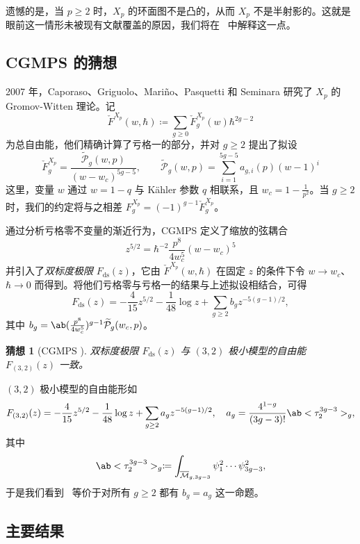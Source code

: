 \documentclass{amsart}
\newtheorem{conj}[thm]{猜想}
\theoremstyle{definition}
\theoremstyle{remark}
\theoremstyle{plain}
\theoremstyle{definition}
\theoremstyle{remark}
\newcommand{\Mbar}{\overline{\mathcal{M}}}
\newcommand{\mc}[1]{\mathcal{#1}}
\newcommand{\mr}[1]{\mathrm{#1}}
\newcommand{\wt}[1]{\widetilde{#1}}
\newcommand{\1}{\mathbf{1}}
\newcommand{\2}{\mathbf{2}}
\newcommand{\3}{\mathbf{3}}
\begin{document}
遗憾的是，当 \(p \geq 2\) 时，\(X_p\) 的环面图不是凸的，从而 \(X_p\) 不是半射影的。这就是眼前这一情形未被现有文献覆盖的原因，我们将在~ 中解释这一点。

\subsection{CGMPS 的猜想}%
\label{sub:The conjecture of CGMPS}

2007 年，Caporaso、Griguolo、Mari\~{n}o、Pasquetti 和 Seminara 研究了 \(X_p\) 的 Gromov-Witten 理论。记
\[ \check{F}^{X_p}(w,\hbar) \coloneqq \sum_{g \geq 0} \check{F}_g^{X_p}(w) \hbar^{2g-2} \]
为总自由能，他们精确计算了亏格一的部分，并对 \(g \geq 2\) 提出了拟设
\begin{equation}\label{eqn:cgmps ansatz}
    \check{F}_g^{X_p} = \frac{\wt{\mc{P}}_g(w,p)}{(w-w_c)^{5g-5}}, \qquad \wt{\mc{P}}_g(w,p) = \sum_{i=1}^{5g-5} a_{g,i}(p)(w-1)^i
\end{equation}
这里，变量 \(w\) 通过 \(w = 1-q\) 与 Kähler 参数 \(q\) 相联系，且 \(w_c = 1 - \frac{1}{p^2}\)。当 \(g \geq 2\) 时，我们的约定将与之相差 \(F_g^{X_p} = (-1)^{g-1}\check{F}_g^{X_p}\)。

通过分析亏格零不变量的渐近行为，CGMPS 定义了缩放的弦耦合
\[ z^{5/2} = \hbar^{-2} \frac{p^8}{4w_c^5}(w-w_c)^5 \]
并引入了\textit{双标度极限} \(F_{\mr{ds}}(z)\)，它由 \(\check{F}^{X_p}(w,\hbar)\) 在固定 \(z\) 的条件下令 \(w \to w_c\)、\(\hbar \to 0\) 而得到。将他们亏格零与亏格一的结果与上述拟设相结合，可得
\[ F_{\mr{ds}}(z) = -\frac{4}{15}z^{5/2} - \frac{1}{48}\log z + \sum_{g \geq 2} b_g z^{-5(g-1)/2}, \]
其中 \(b_g = \ab(\frac{p^8}{4w_c^5})^{g-1}\wt{\mc{P}}_g(w_c,p)\)。

\begin{conj}[CGMPS {\cite{CGMPS2007}}]%
\label{conj:cgmps}
    双标度极限 \(F_{\mr{ds}}(z)\) 与 \((3,2)\) 极小模型的自由能 \(F_{(3,2)}(z)\) 一致。
\end{conj}

\((3,2)\) 极小模型的自由能形如
\[ F_{(3,2)}(z) = -\frac{4}{15}z^{5/2} - \frac{1}{48}\log z + \sum_{g\geq2} a_g z^{-5(g-1)/2}, \quad a_g = \frac{4^{1-g}}{(3g-3)!}\ab<\tau_2^{3g-3}>_g, \]
其中
\[ \ab<\tau_2^{3g-3}>_g \coloneqq \int_{\Mbar_{g,3g-3}} \psi_1^2 \cdots \psi_{3g-3}^2, \]
于是我们看到~ 等价于对所有 \(g \geq 2\) 都有 \(b_g = a_g\) 这一命题。

\subsection{主要结果}%
\label{sub:The main results (Guo local P1)}
\end{document}
